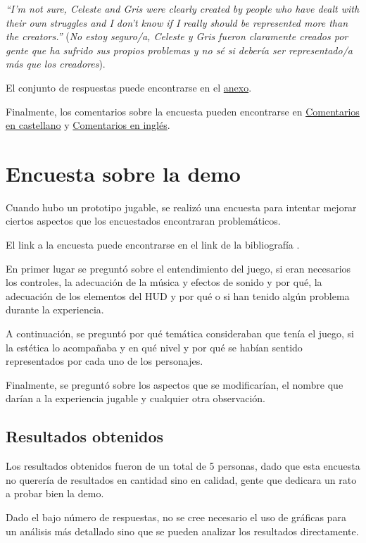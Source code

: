 \documentclass[12pt, a4paper,twoside,titlepage]{book}
\begin{document}
\textit{``I'm not sure, Celeste and Gris were clearly created by people who have dealt with their own struggles and I don't know if I really should be represented more than the creators.''} (\textit{No estoy seguro/a, Celeste y Gris fueron claramente creados por gente que ha sufrido sus propios problemas y no sé si debería ser representado/a más que los creadores}). 

El conjunto de respuestas puede encontrarse en el \hyperref[representacionIngles]{anexo}.

Finalmente, los comentarios sobre la encuesta pueden encontrarse en \hyperref[comentariosCastellano]{Comentarios en castellano} y \hyperref[comentariosIngles]{Comentarios en inglés}.




\section{Encuesta sobre la demo}
\label{sec:encuestaDemo}
Cuando hubo un prototipo jugable, se realizó una encuesta para intentar mejorar ciertos aspectos que los encuestados encontraran problemáticos. 

El link a la encuesta puede encontrarse en el link de la bibliografía . 

En primer lugar se preguntó sobre el entendimiento del juego, si eran necesarios los controles, la adecuación de la música y efectos de sonido y por qué, la adecuación de los elementos del HUD y por qué o si han tenido algún problema durante la experiencia. 

A continuación, se preguntó por qué temática consideraban que tenía el juego, si la estética lo acompañaba y en qué nivel y por qué se habían sentido representados por cada uno de los personajes. 

Finalmente, se preguntó sobre los aspectos que se modificarían, el nombre que darían a la experiencia jugable y cualquier otra observación. 


\subsection{Resultados obtenidos}

Los resultados obtenidos fueron de un total de 5 personas, dado que esta encuesta no querería de resultados en cantidad sino en calidad, gente que dedicara un rato a probar bien la demo. 

Dado el bajo número de respuestas, no se cree necesario el uso de gráficas para un análisis más detallado sino que se pueden analizar los resultados directamente. 
\end{document}
